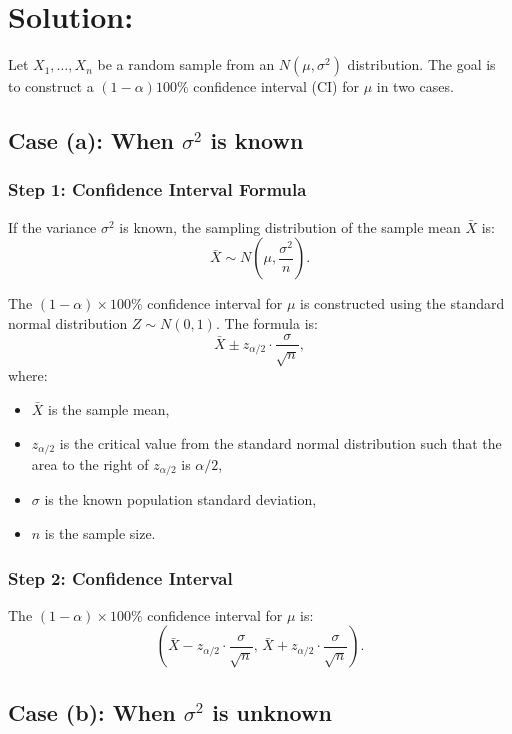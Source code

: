 \documentclass{article}
\begin{document}
\section*{Solution:}

Let $X_1, \dots, X_n$ be a random sample from an $N(\mu, \sigma^2)$ distribution. The goal is to construct a $(1 - \alpha)100\%$ confidence interval (CI) for $\mu$ in two cases.

\subsection*{Case (a): When $\sigma^2$ is known}

\subsubsection*{Step 1: Confidence Interval Formula}
If the variance $\sigma^2$ is known, the sampling distribution of the sample mean $\bar{X}$ is:
\[
\bar{X} \sim N\left(\mu, \frac{\sigma^2}{n}\right).
\]

The $(1 - \alpha) \times 100\%$ confidence interval for $\mu$ is constructed using the standard normal distribution $Z \sim N(0, 1)$. The formula is:
\[
\bar{X} \pm z_{\alpha/2} \cdot \frac{\sigma}{\sqrt{n}},
\]
where:
\begin{itemize}
    \item $\bar{X}$ is the sample mean,
    \item $z_{\alpha/2}$ is the critical value from the standard normal distribution such that the area to the right of $z_{\alpha/2}$ is $\alpha/2$,
    \item $\sigma$ is the known population standard deviation,
    \item $n$ is the sample size.
\end{itemize}

\subsubsection*{Step 2: Confidence Interval}
The $(1 - \alpha) \times 100\%$ confidence interval for $\mu$ is:
\[
\left( \bar{X} - z_{\alpha/2} \cdot \frac{\sigma}{\sqrt{n}}, \, \bar{X} + z_{\alpha/2} \cdot \frac{\sigma}{\sqrt{n}} \right).
\]

\subsection*{Case (b): When $\sigma^2$ is unknown}
\end{document}
